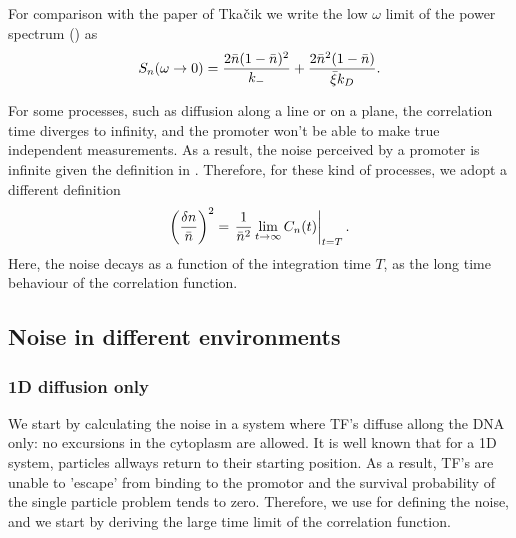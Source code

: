 For comparison with the paper of Tka$\check{\rm c}$ik \cite{Tkacik2009} we write the low $\omega$ limit of the power spectrum () as
\begin{equation}
 S_n(\omega \to 0) = \frac{2 \bar{n}(1-\bar{n})^2}{k_-} + \frac{2\bar{n}^2(1-\bar{n})}{\bar{\xi} k_D}.
 \elabel{Sn}
\end{equation}

For some processes, such as diffusion along a line or on a plane, the correlation time diverges to infinity, and the promoter won't be able to make true independent measurements. As a result, the noise perceived by a promoter is infinite given the definition in . Therefore, for these kind of processes, we adopt a different definition
\begin{equation}
  \left( \frac{\delta n}{\bar{n}} \right)^2 = \left. \frac{1}{\bar{n}^2} \lim_{t \to \infty} C_n(t)  \right|_{t = T}.
  \elabel{EqProNoiseII}
\end{equation}
Here, the noise decays as a function of the integration time $T$, as the long time behaviour of the correlation function.


\subsection{Noise in different environments}

\subsubsection{1D diffusion only}
We start by calculating the noise in a system where TF's diffuse allong the DNA only: no excursions in the cytoplasm are allowed. It is well known \cite{Redner2001} that for a 1D system, particles allways return to their starting position. As a result, TF's are unable to 'escape' from binding to the promotor and the survival probability of the single particle problem tends to zero. Therefore, we use  for defining the noise, and we start by deriving the large time limit of the correlation function.

